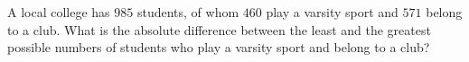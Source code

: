 A local college has $985$ students, of whom $460$ play a varsity sport and $571$ belong to a club. What is the absolute difference between the least and the greatest possible numbers of students who play a varsity sport and belong to a club?
